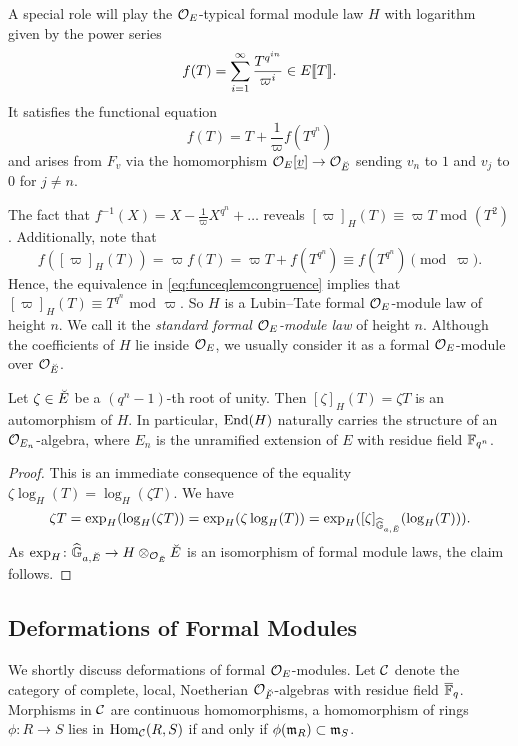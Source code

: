 \documentclass[../main.tex]{subfiles}
\begin{document}
A special role will play the $\mathcal{O}_E$-typical formal module law $H$
with logarithm given by the power series
\begin{equation*}
  f(T) = \sum_{i=1}^\infty \frac{T^{q^{in}}}{\varpi^i} \in E\llbracket T \rrbracket.
\end{equation*}
It satisfies the functional equation
\begin{equation*}
  f(T) = T + \frac 1\varpi f(T^{q^n})
\end{equation*}
and arises from $F_v$ via the homomorphism $\mathcal{O}_E[\underline v] \to \mathcal{O}_{\breve {E}}$
sending $v_n$ to $1$ and $v_j$ to $0$ for $j \neq n$. 

The fact that $f^{-1}(X) = X - \frac 1\varpi X^{q^n} + \dots$ reveals
$[\varpi]_H(T) \equiv \varpi T$ mod $(T^2)$. Additionally, note that 
\begin{equation*}
  f([\varpi]_H(T)) = \varpi f(T) = \varpi T + f(T^{q^n}) \equiv f(T^{q^n}) \pmod \varpi.
\end{equation*}
Hence, the equivalence in \eqref{eq:funceqlemcongruence} implies that 
$[\varpi]_H(T) \equiv T^{q^n}$ mod $\varpi$. So $H$ is a Lubin--Tate formal
$\mathcal{O}_E$-module law of height $n$. We call it the \emph{standard formal
$\mathcal{O}_E$-module law} of height $n$. Although the coefficients of $H$ lie inside
$\mathcal{O}_E$,
we usually consider it as a formal $\mathcal{O}_E$-module over $\mathcal{O}_{\breve {E}}$.

\begin{lem}\label{lem:MultByROUForStandardModule}
  Let $\zeta \in {\breve {E}}$ be a $(q^n-1)$-th root of unity. Then 
  $[\zeta]_H(T) = \zeta T$ is an automorphism of $H$. In particular,
  $\operatorname{End}(H)$ naturally carries the structure of an $\mathcal{O}_{E_n}$-algebra,
  where $E_n$ is the unramified extension of $E$ with residue field
  $\mathbb{F}_{q^n}$. 
\begin{proof}
  This is an immediate consequence of the equality $\zeta \log_H(T)
  = \log_H(\zeta T)$. We have
  \begin{equation*}
    \zeta T = \exp_H(\log_H(\zeta T)) = \exp_H(\zeta \log_H(T)) = \exp_H
    ([\zeta]_{\widehat{\mathbb{G}}_{a, {\breve {E}}}}(\log_H(T))).
  \end{equation*}
  As $\exp_H\colon  \widehat{\mathbb{G}}_{a, {\breve {E}}} \to H \otimes_{\mathcal{O}_{\breve {E}}} {\breve {E}}$ is an
  isomorphism of formal module laws, the claim follows.
\end{proof}
\end{lem}


\subsection{Deformations of Formal Modules} %
\label{sub:Deformations of Formal Modules}
We shortly discuss deformations of formal $\mathcal{O}_E$-modules.
Let $\mathcal{C}$ denote the category of complete, local, Noetherian
$\mathcal{O}_{\breve {F}}$-algebras with residue field $\overline {\mathbb{F}}_q$. Morphisms in $\mathcal{C}$ are continuous
homomorphisms, a homomorphism of rings $\phi: R \to S$ lies in 
$\operatorname{Hom}_{\mathcal{C}}(R,S)$ if and only if $\phi(\mathfrak{m}_R) \subset \mathfrak{m}_S$.
\end{document}
